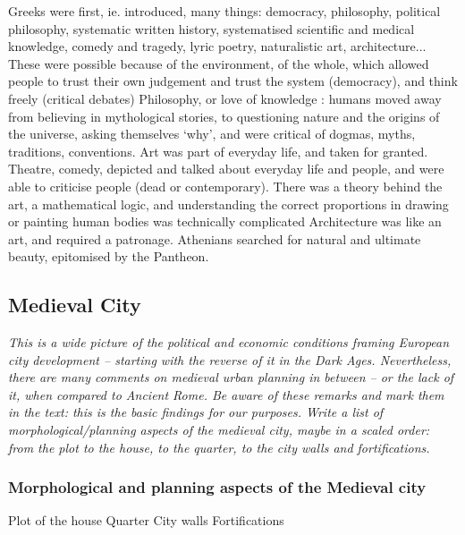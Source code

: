 \documentclass{article}
\begin{document}
\begin{outline}
	\1 Greeks were first, ie. introduced, many things: democracy, philosophy, political philosophy, systematic written history, systematised scientific and medical knowledge, comedy and tragedy, lyric poetry, naturalistic art, architecture... These were possible because of the environment, of the whole, which allowed people to trust their own judgement and trust the system (democracy), and think freely (critical debates)
	\1 Philosophy, or love of knowledge : humans moved away from believing in mythological stories, to questioning nature and the origins of the universe, asking themselves `why', and were critical of dogmas, myths, traditions, conventions.
	\1 Art was part of everyday life, and taken for granted. Theatre, comedy, depicted and talked about everyday life and people, and were able to criticise people (dead or contemporary). There was a theory behind the art, a mathematical logic, and understanding the correct proportions in drawing or painting human bodies was technically complicated
	\1 Architecture was like an art, and required a patronage. Athenians searched for natural and ultimate beauty, epitomised by the Pantheon. 

\end{outline}

\subsection{Medieval City}

\textit{This is a wide picture of the political and economic conditions
framing European city development – starting with the reverse of it in the Dark Ages.
Nevertheless, there are many comments on medieval urban planning in between – or the
lack of it, when compared to Ancient Rome. Be aware of these remarks and mark them in the text: this is the basic findings for our purposes. Write a list of
morphological/planning aspects of the medieval city, maybe in a scaled order: from the plot to the house, to the quarter, to the city walls and fortifications.}

\subsubsection{Morphological and planning aspects of the Medieval city}

\begin{outline}
	\1 Plot of the house
	\1 Quarter
	\1 City walls
	\1 Fortifications
\end{outline}
\end{document}
